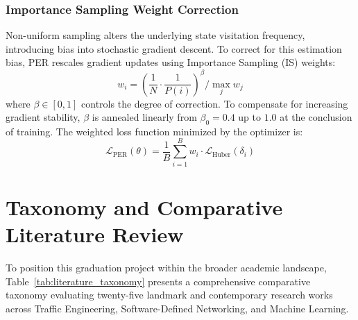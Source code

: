 \documentclass[12pt,a4paper,oneside]{report}
\begin{document}
\subsubsection{Importance Sampling Weight Correction}
Non-uniform sampling alters the underlying state visitation frequency, introducing bias into stochastic gradient descent. To correct for this estimation bias, PER rescales gradient updates using Importance Sampling (IS) weights:
\begin{equation}
    w_i = \left( \frac{1}{N} \cdot \frac{1}{P(i)} \right)^\beta \Big/ \max_{j} w_j
    \label{eq:per_is_weights}
\end{equation}
where $\beta \in [0, 1]$ controls the degree of correction. To compensate for increasing gradient stability, $\beta$ is annealed linearly from $\beta_0 = 0.4$ up to $1.0$ at the conclusion of training. The weighted loss function minimized by the optimizer is:
\begin{equation}
    \mathcal{L}_{\text{PER}}(\theta) = \frac{1}{B} \sum_{i=1}^B w_i \cdot \mathcal{L}_{\text{Huber}}(\delta_i)
\end{equation}

\section{Taxonomy and Comparative Literature Review}
To position this graduation project within the broader academic landscape, Table~\ref{tab:literature_taxonomy} presents a comprehensive comparative taxonomy evaluating twenty-five landmark and contemporary research works across Traffic Engineering, Software-Defined Networking, and Machine Learning.
\end{document}
